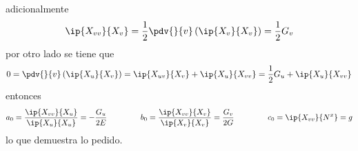 \documentclass{article}
\begin{document}
\begin{enumerate}
    adicionalmente
    \begin{equation*}
        \ip{X_{vv}}{X_{v}}=\frac{1}{2}\pdv{}{v}\left(\ip{X_{v}}{X_{v}}\right)=\frac{1}{2}G_{v}
    \end{equation*}
    por otro lado se tiene que
    \begin{equation*}
        0=\pdv{}{v}\left(\ip{X_{u}}{X_{v}}\right)=\ip{X_{uv}}{X_{v}}+\ip{X_{u}}{X_{vv}}
        =\frac{1}{2}G_{u}+\ip{X_{u}}{X_{vv}}
    \end{equation*}
    entonces
    \begin{equation*}
        a_{0}=\frac{\ip{X_{vv}}{X_{u}}}{\ip{X_{u}}{X_{u}}}=-\frac{G_{u}}{2E}\hspace{1.5cm}
        b_{0}=\frac{\ip{X_{vv}}{X_{v}}}{\ip{X_{v}}{X_{v}}}=\frac{G_{v}}{2G}\hspace{1.5cm}
        c_{0}=\ip{X_{vv}}{N^{x}}=g
    \end{equation*}
    lo que demuestra lo pedido.


\end{enumerate}
\end{document}

